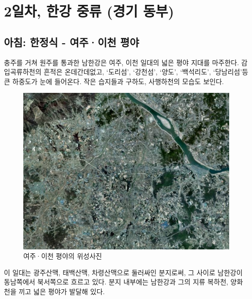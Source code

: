 \chapter{2일차, 한강 중류 (경기 동부)}
\section{아침: 한정식 - 여주·이천 평야}
충주를 거쳐 원주를 통과한 남한강은 여주, 이천 일대의 넓은 평야 지대를 마주한다. 
감입곡류하천의 흔적은 온데간데없고, `도리섬', `강천섬', ‘양도’, ‘백석리도’, `당남리섬'등 큰 하중도가 눈에 들어온다.
작은 습지들과 구하도, 사행하천의 모습도 보인다.

\begin{figure}[ht]
    \centering
    \includegraphics[width=.6\textwidth]{img/여주이천평야.jpg}
    \caption{여주·이천 평야의 위성사진\protect\footnotemark}
    \label{fig:my_label}
\end{figure}


이 일대는 
광주산맥, 태백산맥, 차령산맥으로 둘러싸인 분지로써,
그 사이로 남한강이 동남쪽에서 북서쪽으로 흐르고 있다.
분지 내부에는 남한강과 그의 지류 복하천, 양화천을 끼고 넓은 평야가 발달해 있다.


